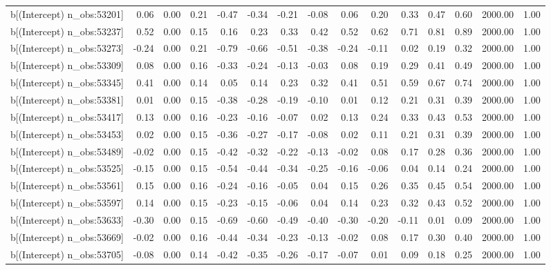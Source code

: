 \begin{table}[ht]
\begin{tabular}{rrrrrrrrrrrrrrr}
  b[(Intercept) n\_obs:53201] & 0.06 & 0.00 & 0.21 & -0.47 & -0.34 & -0.21 & -0.08 & 0.06 & 0.20 & 0.33 & 0.47 & 0.60 & 2000.00 & 1.00 \\ 
  b[(Intercept) n\_obs:53237] & 0.52 & 0.00 & 0.15 & 0.16 & 0.23 & 0.33 & 0.42 & 0.52 & 0.62 & 0.71 & 0.81 & 0.89 & 2000.00 & 1.00 \\ 
  b[(Intercept) n\_obs:53273] & -0.24 & 0.00 & 0.21 & -0.79 & -0.66 & -0.51 & -0.38 & -0.24 & -0.11 & 0.02 & 0.19 & 0.32 & 2000.00 & 1.00 \\ 
  b[(Intercept) n\_obs:53309] & 0.08 & 0.00 & 0.16 & -0.33 & -0.24 & -0.13 & -0.03 & 0.08 & 0.19 & 0.29 & 0.41 & 0.49 & 2000.00 & 1.00 \\ 
  b[(Intercept) n\_obs:53345] & 0.41 & 0.00 & 0.14 & 0.05 & 0.14 & 0.23 & 0.32 & 0.41 & 0.51 & 0.59 & 0.67 & 0.74 & 2000.00 & 1.00 \\ 
  b[(Intercept) n\_obs:53381] & 0.01 & 0.00 & 0.15 & -0.38 & -0.28 & -0.19 & -0.10 & 0.01 & 0.12 & 0.21 & 0.31 & 0.39 & 2000.00 & 1.00 \\ 
  b[(Intercept) n\_obs:53417] & 0.13 & 0.00 & 0.16 & -0.23 & -0.16 & -0.07 & 0.02 & 0.13 & 0.24 & 0.33 & 0.43 & 0.53 & 2000.00 & 1.00 \\ 
  b[(Intercept) n\_obs:53453] & 0.02 & 0.00 & 0.15 & -0.36 & -0.27 & -0.17 & -0.08 & 0.02 & 0.11 & 0.21 & 0.31 & 0.39 & 2000.00 & 1.00 \\ 
  b[(Intercept) n\_obs:53489] & -0.02 & 0.00 & 0.15 & -0.42 & -0.32 & -0.22 & -0.13 & -0.02 & 0.08 & 0.17 & 0.28 & 0.36 & 2000.00 & 1.00 \\ 
  b[(Intercept) n\_obs:53525] & -0.15 & 0.00 & 0.15 & -0.54 & -0.44 & -0.34 & -0.25 & -0.16 & -0.06 & 0.04 & 0.14 & 0.24 & 2000.00 & 1.00 \\ 
  b[(Intercept) n\_obs:53561] & 0.15 & 0.00 & 0.16 & -0.24 & -0.16 & -0.05 & 0.04 & 0.15 & 0.26 & 0.35 & 0.45 & 0.54 & 2000.00 & 1.00 \\ 
  b[(Intercept) n\_obs:53597] & 0.14 & 0.00 & 0.15 & -0.23 & -0.15 & -0.06 & 0.04 & 0.14 & 0.23 & 0.32 & 0.43 & 0.52 & 2000.00 & 1.00 \\ 
  b[(Intercept) n\_obs:53633] & -0.30 & 0.00 & 0.15 & -0.69 & -0.60 & -0.49 & -0.40 & -0.30 & -0.20 & -0.11 & 0.01 & 0.09 & 2000.00 & 1.00 \\ 
  b[(Intercept) n\_obs:53669] & -0.02 & 0.00 & 0.16 & -0.44 & -0.34 & -0.23 & -0.13 & -0.02 & 0.08 & 0.17 & 0.30 & 0.40 & 2000.00 & 1.00 \\ 
  b[(Intercept) n\_obs:53705] & -0.08 & 0.00 & 0.14 & -0.42 & -0.35 & -0.26 & -0.17 & -0.07 & 0.01 & 0.09 & 0.18 & 0.25 & 2000.00 & 1.00 \\ 

\end{tabular}
\end{table}
